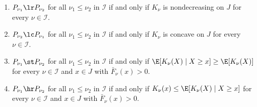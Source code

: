 \documentclass[11pt]{article}
\begin{document}
\begin{thm}
\label{thm:four-criteria}
\leavevmode
\begin{enumerate}[label=\textup{(\roman*)}]
\item \(P_{\nu_1}\lr P_{\nu_2}\) for all \(\nu_1\le\nu_2\) in \(\mathcal I\) if and only if \(K_\nu\) is nondecreasing on \(J\) for every \(\nu\in\mathcal I\).

\item \(P_{\nu_2}\lc P_{\nu_1}\) for all \(\nu_1\le\nu_2\) in \(\mathcal I\) if and only if \(K_\nu\) is concave on \(J\) for every \(\nu\in\mathcal I\).

\item \(P_{\nu_1}\st P_{\nu_2}\) for all \(\nu_1\le\nu_2\) in \(\mathcal I\) if and only if \(\E[K_\nu(X)\mid X\ge x]\ge\E[K_\nu(X)]\) for every \(\nu\in\mathcal I\) and \(x\in J\) with \(\bar F_\nu(x)>0\).

\item \(P_{\nu_1}\hr P_{\nu_2}\) for all \(\nu_1\le\nu_2\) in \(\mathcal I\) if and only if \(K_\nu(x)\le\E[K_\nu(X)\mid X\ge x]\) for every \(\nu\in\mathcal I\) and \(x\in J\) with \(\bar F_\nu(x)>0\).
\end{enumerate}
\end{thm}
\end{document}
